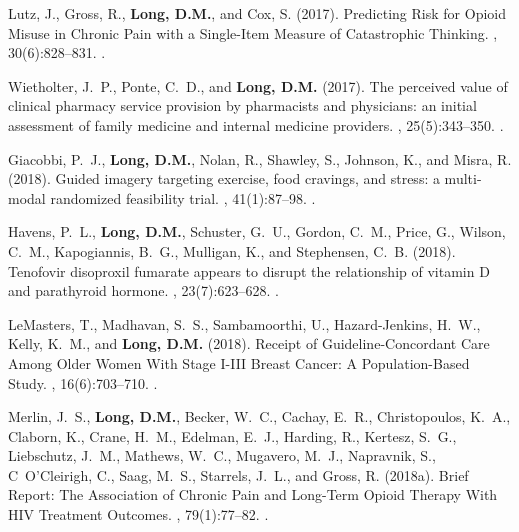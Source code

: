\begin{thebibliography}{}
Lutz, J., Gross, R., \textbf{Long, D.M.}, and Cox, S. (2017).
\newblock Predicting {Risk} for {Opioid} {Misuse} in {Chronic} {Pain} with a
  {Single}-{Item} {Measure} of {Catastrophic} {Thinking}.
,
  30(6):828--831.
.   


Wietholter, J.~P., Ponte, C.~D., and \textbf{Long, D.M.} (2017).
\newblock The perceived value of clinical pharmacy service provision by
  pharmacists and physicians: an initial assessment of family medicine and
  internal medicine providers.
, 25(5):343--350.
.  


Giacobbi, P.~J., \textbf{Long, D.M.}, Nolan, R., Shawley, S., Johnson, K., and Misra, R.
  (2018).
\newblock Guided imagery targeting exercise, food cravings, and stress: a
  multi- modal randomized feasibility trial.
, 41(1):87--98.
.  


Havens, P.~L., \textbf{Long, D.M.}, Schuster, G.~U., Gordon, C.~M., Price, G., Wilson,
  C.~M., Kapogiannis, B.~G., Mulligan, K., and Stephensen, C.~B. (2018).
\newblock Tenofovir disoproxil fumarate appears to disrupt the relationship of
  vitamin {D} and parathyroid hormone.
, 23(7):623--628.
.   


LeMasters, T., Madhavan, S.~S., Sambamoorthi, U., Hazard-Jenkins, H.~W., Kelly,
  K.~M., and \textbf{Long, D.M.} (2018).
\newblock Receipt of {Guideline}-{Concordant} {Care} {Among} {Older} {Women}
  {With} {Stage} {I}-{III} {Breast} {Cancer}: {A} {Population}-{Based} {Study}.
,
  16(6):703--710.
.  


Merlin, J.~S., \textbf{Long, D.M.}, Becker, W.~C., Cachay, E.~R., Christopoulos, K.~A.,
  Claborn, K., Crane, H.~M., Edelman, E.~J., Harding, R., Kertesz, S.~G.,
  Liebschutz, J.~M., Mathews, W.~C., Mugavero, M.~J., Napravnik, S.,
  C~O'Cleirigh, C., Saag, M.~S., Starrels, J.~L., and Gross, R. (2018a).
\newblock Brief {Report}: {The} {Association} of {Chronic} {Pain} and
  {Long}-{Term} {Opioid} {Therapy} {With} {HIV} {Treatment} {Outcomes}.
,
  79(1):77--82.
.  



\end{thebibliography}
